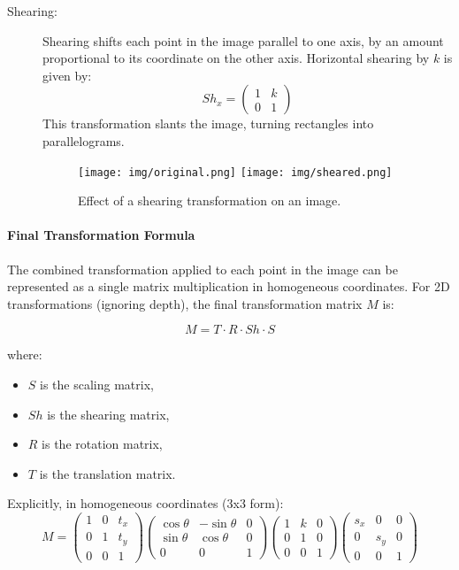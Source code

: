 \documentclass{article}
\begin{document}
\begin{description}
    \item[Shearing:] Shearing shifts each point in the image parallel to one axis, by an amount proportional to its coordinate on the other axis. Horizontal shearing by $k$ is given by:
    \[
    Sh_x = \begin{pmatrix}
        1 & k \\
        0 & 1
    \end{pmatrix}
    \]
    This transformation slants the image, turning rectangles into parallelograms.

    \begin{figure}[h]
        \centering
        \texttt{[image: img/original.png]}
        \hspace{0.5em}
        \texttt{[image: img/sheared.png]}
        \caption{Effect of a shearing transformation on an image.}
        \label{fig:shearing_example}
    \end{figure}
\end{description}


\paragraph{Final Transformation Formula}

The combined transformation applied to each point in the image can be represented as a single matrix multiplication in homogeneous coordinates. For 2D transformations (ignoring depth), the final transformation matrix $M$ is:

\[
M = T \cdot R \cdot Sh \cdot S
\]

where:
\begin{itemize}
    \item $S$ is the scaling matrix,
    \item $Sh$ is the shearing matrix,
    \item $R$ is the rotation matrix,
    \item $T$ is the translation matrix.
\end{itemize}

Explicitly, in homogeneous coordinates (3x3 form):
\[
M = 
\begin{pmatrix}
    1 & 0 & t_x \\
    0 & 1 & t_y \\
    0 & 0 & 1
\end{pmatrix}
\begin{pmatrix}
    \cos\theta & -\sin\theta & 0 \\
    \sin\theta & \cos\theta & 0 \\
    0 & 0 & 1
\end{pmatrix}
\begin{pmatrix}
    1 & k & 0 \\
    0 & 1 & 0 \\
    0 & 0 & 1
\end{pmatrix}
\begin{pmatrix}
    s_x & 0 & 0 \\
    0 & s_y & 0 \\
    0 & 0 & 1
\end{pmatrix}
\]
\end{document}
